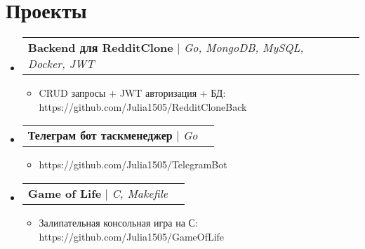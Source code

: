 \documentclass[letterpaper,12pt]{article}
\makeatletter
\newcommand{\resumeItem}[1]{
  \item\small{
    {#1 \vspace{-2pt}}
  }
}
\newcommand{\resumeProjectHeading}[2]{
    \item
    \begin{tabular*}{1.001\textwidth}{l@{\extracolsep{\fill}}r}
      \small#1 & \textbf{\small #2}\\
    \end{tabular*}\vspace{-7pt}
}
\newcommand{\resumeSubHeadingListStart}{\begin{itemize}[leftmargin=0.0in, label={}]}
\newcommand{\resumeSubHeadingListEnd}{\end{itemize}}
\newcommand{\resumeItemListStart}{\begin{itemize}}
\newcommand{\resumeItemListEnd}{\end{itemize}\vspace{-5pt}}
\makeatother
\begin{document}





\section{Проекты}
    \vspace{-5pt}
    \resumeSubHeadingListStart
      \resumeProjectHeading
          {\textbf{Backend для RedditClone} $|$ \emph{Go, MongoDB, MySQL, Docker, JWT}}{}
          \resumeItemListStart
            \resumeItem{CRUD запросы + JWT авторизация + БД:  https://github.com/Julia1505/RedditCloneBack}

          \resumeItemListEnd
          \vspace{-17pt}

    \resumeProjectHeading
          {\textbf{Телеграм бот таскменеджер} $|$ \emph{Go}}{}
          \resumeItemListStart
            \resumeItem{https://github.com/Julia1505/TelegramBot}
          \resumeItemListEnd
          \vspace{-17pt}

     \resumeProjectHeading
          {\textbf{Game of Life} $|$ \emph{C, Makefile}}{}
          \resumeItemListStart
            \resumeItem{Залипательная консольная игра на С: https://github.com/Julia1505/GameOfLife}
          \resumeItemListEnd
          \vspace{-10pt}
    \resumeSubHeadingListEnd
\vspace{-15pt}
\end{document}

